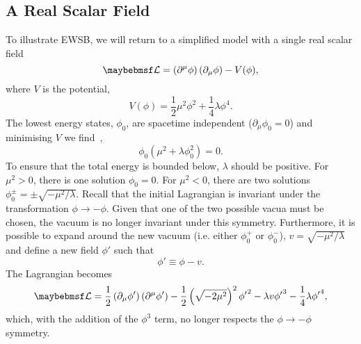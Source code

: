 \subsection{A Real Scalar Field}
To illustrate \ac{EWSB}, we will return to a simplified model with a single real
scalar field
\begin{equation*}
\lagrangiand = \left(\partial^{\mu}\phi\right)\left(\partial_{\mu}\phi\right)
-V(\phi),
\end{equation*}
where $V$ is the potential,
\begin{equation*}
V(\phi) = \frac{1}{2}\mu^2\phi^2 + \frac{1}{4}\lambda\phi^4.
\end{equation*}
The lowest energy states, $\phi_0$, are spacetime independent ($\partial_{\mu}
\phi_0 = 0$) and minimising $V$ we find~\cite{qft_nutshell},
\begin{equation*}
\phi_0 \left (\mu^2 + \lambda\phi_0^2\right) = 0.
\end{equation*}
To ensure that the total energy is bounded below, $\lambda$ should be
positive. For $\mu^2 > 0$, there is one solution $\phi_0 = 0$. For $\mu^2 < 0$,
there are two solutions $\phi^\pm_0 = \pm \sqrt{-\mu^2/\lambda}$. Recall that
the initial Lagrangian is invariant under the transformation $\phi
\longrightarrow -\phi$. Given that one of the two possible vacua must be chosen,
the vacuum is no longer invariant under this symmetry. Furthermore, it is
possible to expand around the new vacuum (i.e. either $\phi_0^+$ or $\phi_0^-$),
$v=\sqrt{-\mu^2/\lambda}$ and define a new field $\phi'$ such that
\begin{equation*}
\phi' \equiv \phi - v.
\end{equation*}
The Lagrangian becomes
\begin{equation*}
\lagrangiand = \frac{1}{2}
\left(\partial_{\mu}\phi'\right)\left(\partial^{\mu}\phi'\right)
-\frac{1}{2}\left(\sqrt{-2\mu^2}\right)^2{\phi'}^2 - \lambda v {\phi'}^3
-\frac{1}{4}\lambda{\phi'}^4,
\end{equation*}
which, with the addition of the $\phi^3$ term, no longer respects the $\phi
\longrightarrow -\phi$ symmetry.

